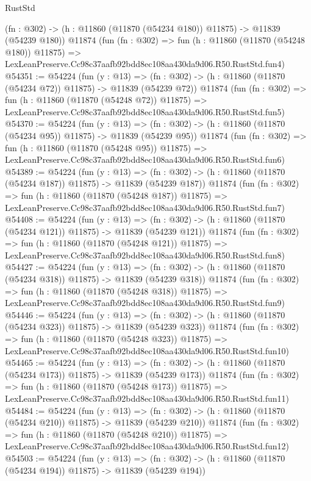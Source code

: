 \begin{lexlean}{RustStd}
\begin{coremodule}
    (fn : @302) -> (h : @11860 (@11870 (@54234 @180)) @11875) -> @11839 (@54239 @180))
    @11874
    (fun (fn : @302) =>
    fun (h : @11860 (@11870 (@54248 @180)) @11875) =>
    LexLeanPreserve.Cc98c37aafb92bdd8ec108aa430da9d06.R50.RustStd.fun4)
@54351 := @54224
    (fun (y : @13) =>
    (fn : @302) -> (h : @11860 (@11870 (@54234 @72)) @11875) -> @11839 (@54239 @72))
    @11874
    (fun (fn : @302) =>
    fun (h : @11860 (@11870 (@54248 @72)) @11875) =>
    LexLeanPreserve.Cc98c37aafb92bdd8ec108aa430da9d06.R50.RustStd.fun5)
@54370 := @54224
    (fun (y : @13) =>
    (fn : @302) -> (h : @11860 (@11870 (@54234 @95)) @11875) -> @11839 (@54239 @95))
    @11874
    (fun (fn : @302) =>
    fun (h : @11860 (@11870 (@54248 @95)) @11875) =>
    LexLeanPreserve.Cc98c37aafb92bdd8ec108aa430da9d06.R50.RustStd.fun6)
@54389 := @54224
    (fun (y : @13) =>
    (fn : @302) -> (h : @11860 (@11870 (@54234 @187)) @11875) -> @11839 (@54239 @187))
    @11874
    (fun (fn : @302) =>
    fun (h : @11860 (@11870 (@54248 @187)) @11875) =>
    LexLeanPreserve.Cc98c37aafb92bdd8ec108aa430da9d06.R50.RustStd.fun7)
@54408 := @54224
    (fun (y : @13) =>
    (fn : @302) -> (h : @11860 (@11870 (@54234 @121)) @11875) -> @11839 (@54239 @121))
    @11874
    (fun (fn : @302) =>
    fun (h : @11860 (@11870 (@54248 @121)) @11875) =>
    LexLeanPreserve.Cc98c37aafb92bdd8ec108aa430da9d06.R50.RustStd.fun8)
@54427 := @54224
    (fun (y : @13) =>
    (fn : @302) -> (h : @11860 (@11870 (@54234 @318)) @11875) -> @11839 (@54239 @318))
    @11874
    (fun (fn : @302) =>
    fun (h : @11860 (@11870 (@54248 @318)) @11875) =>
    LexLeanPreserve.Cc98c37aafb92bdd8ec108aa430da9d06.R50.RustStd.fun9)
@54446 := @54224
    (fun (y : @13) =>
    (fn : @302) -> (h : @11860 (@11870 (@54234 @323)) @11875) -> @11839 (@54239 @323))
    @11874
    (fun (fn : @302) =>
    fun (h : @11860 (@11870 (@54248 @323)) @11875) =>
    LexLeanPreserve.Cc98c37aafb92bdd8ec108aa430da9d06.R50.RustStd.fun10)
@54465 := @54224
    (fun (y : @13) =>
    (fn : @302) -> (h : @11860 (@11870 (@54234 @173)) @11875) -> @11839 (@54239 @173))
    @11874
    (fun (fn : @302) =>
    fun (h : @11860 (@11870 (@54248 @173)) @11875) =>
    LexLeanPreserve.Cc98c37aafb92bdd8ec108aa430da9d06.R50.RustStd.fun11)
@54484 := @54224
    (fun (y : @13) =>
    (fn : @302) -> (h : @11860 (@11870 (@54234 @210)) @11875) -> @11839 (@54239 @210))
    @11874
    (fun (fn : @302) =>
    fun (h : @11860 (@11870 (@54248 @210)) @11875) =>
    LexLeanPreserve.Cc98c37aafb92bdd8ec108aa430da9d06.R50.RustStd.fun12)
@54503 := @54224
    (fun (y : @13) =>
    (fn : @302) -> (h : @11860 (@11870 (@54234 @194)) @11875) -> @11839 (@54239 @194))

\end{coremodule}
\end{lexlean}
